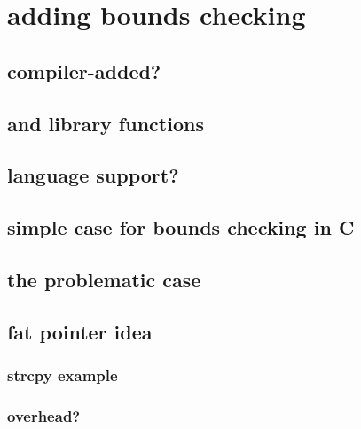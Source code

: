 \usetikzlibrary{calc}

\section{adding bounds checking}


\subsection{compiler-added?}

\subsection{and library functions}


\subsection{language support?}



\subsection{simple case for bounds checking in C}


\subsection{the problematic case}


\subsection{fat pointer idea}


\subsubsection{strcpy example}


\subsubsection{overhead?}


